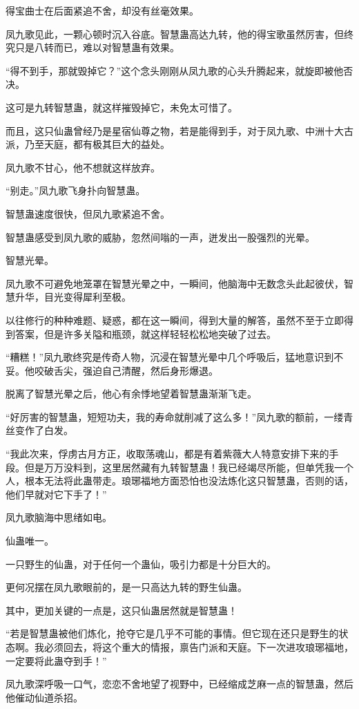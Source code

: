 \begin{this_body}
得宝曲士在后面紧追不舍，却没有丝毫效果。

凤九歌见此，一颗心顿时沉入谷底。智慧蛊高达九转，他的得宝歌虽然厉害，但终究只是八转而已，难以对智慧蛊有效果。

“得不到手，那就毁掉它？”这个念头刚刚从凤九歌的心头升腾起来，就旋即被他否决。

这可是九转智慧蛊，就这样摧毁掉它，未免太可惜了。

而且，这只仙蛊曾经乃是星宿仙尊之物，若是能得到手，对于凤九歌、中洲十大古派，乃至天庭，都有极其巨大的益处。

凤九歌不甘心，他不想就这样放弃。

“别走。”凤九歌飞身扑向智慧蛊。

智慧蛊速度很快，但凤九歌紧追不舍。

智慧蛊感受到凤九歌的威胁，忽然间嗡的一声，迸发出一股强烈的光晕。

智慧光晕。

凤九歌不可避免地笼罩在智慧光晕之中，一瞬间，他脑海中无数念头此起彼伏，智慧升华，目光变得犀利至极。

以往修行的种种难题、疑惑，都在这一瞬间，得到大量的解答，虽然不至于立即得到答案，但是许多关隘和瓶颈，就这样轻轻松松地突破了过去。

“糟糕！”凤九歌终究是传奇人物，沉浸在智慧光晕中几个呼吸后，猛地意识到不妥。他咬破舌尖，强迫自己清醒，然后身形爆退。

脱离了智慧光晕之后，他心有余悸地望着智慧蛊渐渐飞走。

“好厉害的智慧蛊，短短功夫，我的寿命就削减了这么多！”凤九歌的额前，一缕青丝变作了白发。

“我此次来，俘虏古月方正，收取荡魂山，都是有着紫薇大人特意安排下来的手段。但是万万没料到，这里居然藏有九转智慧蛊！我已经竭尽所能，但单凭我一个人，根本无法将此蛊带走。琅琊福地方面恐怕也没法炼化这只智慧蛊，否则的话，他们早就对它下手了！”

凤九歌脑海中思绪如电。

仙蛊唯一。

一只野生的仙蛊，对于任何一个蛊仙，吸引力都是十分巨大的。

更何况摆在凤九歌眼前的，是一只高达九转的野生仙蛊。

其中，更加关键的一点是，这只仙蛊居然就是智慧蛊！

“若是智慧蛊被他们炼化，抢夺它是几乎不可能的事情。但它现在还只是野生的状态啊。我必须回去，将这个重大的情报，禀告门派和天庭。下一次进攻琅琊福地，一定要将此蛊夺到手！”

凤九歌深呼吸一口气，恋恋不舍地望了视野中，已经缩成芝麻一点的智慧蛊，然后他催动仙道杀招。


\end{this_body}
